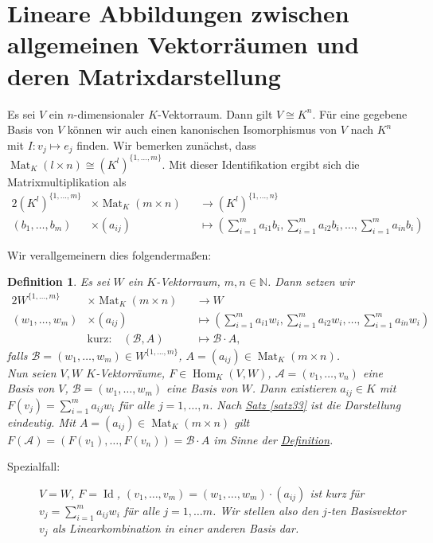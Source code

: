 \documentclass{report}
\newcommand{\N}{\mathbb{N}}
\newcommand{\baseb}{\mathcal{B}}
\newcommand{\basea}{\mathcal{A}}
\DeclareMathOperator{\Hom}{Hom}
\DeclareMathOperator{\Mat}{Mat}
\DeclareMathOperator{\Id}{Id}
\theoremstyle{customrem}
\theoremstyle{customdef}
\newtheorem{definition}{Definition}[chapter]
\begin{document}
\section{Lineare Abbildungen zwischen allgemeinen Vektorräumen und deren Matrixdarstellung}

Es sei $V$ ein $n$-dimensionaler $K$-Vektorraum. Dann gilt $V\cong K^n$. Für eine gegebene Basis von $V$ können wir auch einen kanonischen Isomorphismus von $V$ nach $K^n$ mit $I:v_j\mapsto e_j$ finden. Wir bemerken zunächst, dass $\Mat_K(l\times n)\cong \left(K^l\right)^{\{1, \ldots, m\}}$. Mit dieser Identifikation ergibt sich die Matrixmultiplikation als
\begin{alignat*}{2}
	\left(K^l\right)^{\{1, \ldots, m\}} &\times \Mat_K(m\times n) &&\to \left(K^l\right)^{\{1, \ldots, n\}}\\
							  (b_1, \ldots, b_m) &\times (a_{ij}) &&\mapsto \left(\sum_{i=1}^{m}a_{i1}b_i, \sum_{i=1}^{m}a_{i2}b_i, \ldots, \sum_{i=1}^{m}a_{in}b_i\right)
\end{alignat*}

Wir verallgemeinern dies folgendermaßen:
	
	\begin{definition}
		\label{def45}
		Es sei $W$ ein $K$-Vektorraum, $m,n\in\N$. Dann setzen wir
		\begin{alignat*}{2}
			W^{\{1,\ldots, m\}} &\times \Mat_K(m\times n) &&\to W\\
			(w_1,\ldots, w_m) &\times (a_{ij}) &&\mapsto \left(\sum_{i=1}^{m}a_{i1}w_i, \sum_{i=1}^{m}a_{i2}w_i, \ldots, \sum_{i=1}^{m}a_{in}w_i\right)\\
			&\text{kurz:}\quad (\baseb, A) &&\mapsto \baseb\cdot A,
		\end{alignat*}
		falls $\baseb=(w_1,\ldots, w_m)\in W^{\{1, \ldots, m\}}$, $A=(a_{ij})\in\Mat_K(m\times n)$.\\
		
		Nun seien $V,W$ $K$-Vektorräume, $F\in\Hom_K(V,W)$, $\basea = (v_1,\ldots, v_n)$ eine Basis von $V$, $\baseb=(w_1, \ldots, w_m)$ eine Basis von $W$. Dann existieren $a_{ij} \in K$ mit $F(v_j) = \sum_{i=1}^{m}a_{ij}w_i$ für alle $j=1,\ldots, n$. Nach \hyperref[satz33]{Satz \ref*{satz33}} ist die Darstellung eindeutig. Mit $A=(a_{ij})\in\Mat_K(m\times n)$ gilt $F(\basea) = (F(v_1), \ldots, F(v_n))=\baseb\cdot A$ im Sinne der \hyperref[def45]{Definition}. 
		\begin{description}
			\item[Spezialfall:] $V=W$, $F=\Id$, $(v_1, \ldots, v_m) =(w_1, \ldots, w_m)\cdot(a_{ij})$ ist kurz für $v_j = \sum_{i=1}^{m}a_{ij}w_i$ für alle $j=1,\ldots m$. Wir stellen also den $j$-ten Basisvektor $v_j$ als Linearkombination in einer anderen Basis dar.
		\end{description}
	\end{definition}
	
\end{document}
